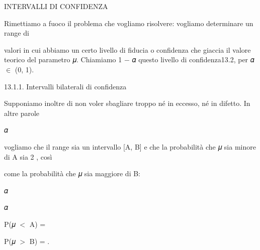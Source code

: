\documentclass[a4paper,portrait,12pt]{article}
\begin{document}
\begin{flushleft}
INTERVALLI DI CONFIDENZA
\end{flushleft}





\begin{flushleft}
Rimettiamo a fuoco il problema che vogliamo risolvere: vogliamo determinare un range di
\end{flushleft}


\begin{flushleft}
valori in cui abbiamo un certo livello di fiducia o confidenza che giaccia il valore teorico del parametro 𝜇. Chiamiamo 1 $-$ 𝛼 questo livello di confidenza13.2, per 𝛼 $\in$ (0, 1).
\end{flushleft}





\begin{flushleft}
13.1.1. Intervalli bilaterali di confidenza
\end{flushleft}


\begin{flushleft}
Supponiamo inoltre di non voler sbagliare troppo n\'{e} in eccesso, n\'{e} in difetto. In altre parole
\end{flushleft}


\begin{flushleft}
𝛼
\end{flushleft}


\begin{flushleft}
vogliamo che il range sia un intervallo [A, B] e che la probabilit\`{a} che 𝜇 sia minore di A sia 2 , così
\end{flushleft}


\begin{flushleft}
come la probabilit\`{a} che 𝜇 sia maggiore di B:
\end{flushleft}


\begin{flushleft}
𝛼
\end{flushleft}


\begin{flushleft}
𝛼
\end{flushleft}


\begin{flushleft}
P(𝜇 $<$ A) =
\end{flushleft}


\begin{flushleft}
P(𝜇 $>$ B) = .
\end{flushleft}
\end{document}

